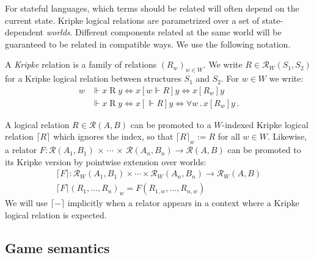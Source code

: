 \documentclass[sigplan,10pt,review,anonymous]{acmart}
\newcommand{\ifr}[1]{\mathrel{[{#1}]}}
\begin{document}

For stateful languages,
which terms should be related
will often depend on the current state.
Kripke logical relations
are parametrized over a set of state-dependent \emph{worlds}.
Different components related at the same world
will be guaranteed to be related in compatible ways.
We use the following notation.

\begin{definition} \label{def:klr} %
A \emph{Kripke} relation is
a family of relations $(R_w)_{w \in W}$.
We write $R \in \mathcal{R}_W(S_1, S_2)$
for a Kripke logical relation between structures $S_1$ and $S_2$.
For $w \in W$ we write:
\begin{align*}
    w &\Vdash x \mathrel{R} y \Leftrightarrow
      x \ifr{w \Vdash R} y \Leftrightarrow
      x \ifr{R_w} y \\
    &\Vdash x \mathrel{R} y \Leftrightarrow
      x \ifr{\Vdash R} y \Leftrightarrow
      \forall w \,.\, x \ifr{R_w} y \,.
\end{align*}
\end{definition}

A logical relation $R \in \mathcal{R}(A, B)$
can be promoted to a $W$-indexed Kripke logical relation $\lceil R \rceil$
which ignores the index, so that $\lceil R \rceil_w := R$ for all $w \in W$.
Likewise,
a relator
  $F : \mathcal{R}(A_1, B_1) \,\times\,\cdots\,\times\,\mathcal{R}(A_n, B_n) \rightarrow \mathcal{R}(A, B)$
can be promoted to its Kripke version
by pointwise extension over worlds:
\begin{gather*}
  \lceil F \rceil : \mathcal{R}_W(A_1, B_1) \times \cdots \times \mathcal{R}_W(A_n, B_n) \rightarrow \mathcal{R}_W(A, B) \\
  \lceil F \rceil (R_1, \ldots, R_n)_w = F(R_{1,w}, \ldots, R_{n,w})
\end{gather*}
We will use $\lceil - \rceil$ implicitly
when a relator appears in a context where
a Kripke logical relation is expected.


\subsection{Game semantics} %

\end{document}

